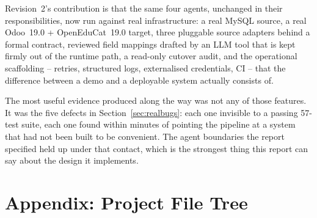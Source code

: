 \documentclass[11pt,a4paper]{article}
\begin{document}
Revision~2's contribution is that the same four agents, unchanged in their responsibilities, now
run against real infrastructure: a real MySQL source, a real Odoo~19.0 + OpenEduCat~19.0 target,
three pluggable source adapters behind a formal contract, reviewed field mappings drafted by an
LLM tool that is kept firmly out of the runtime path, a read-only cutover audit, and the
operational scaffolding -- retries, structured logs, externalised credentials, CI -- that the
difference between a demo and a deployable system actually consists of.

The most useful evidence produced along the way was not any of those features. It was the five
defects in Section~\ref{sec:realbugs}: each one invisible to a passing 57-test suite, each one
found within minutes of pointing the pipeline at a system that had not been built to be
convenient. The agent boundaries the report specified held up under that contact, which is the
strongest thing this report can say about the design it implements.

\appendix
\section{Appendix: Project File Tree}
\end{document}
